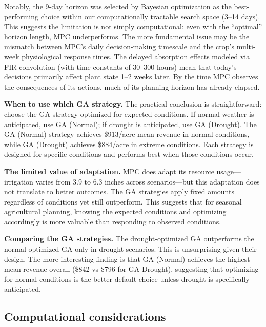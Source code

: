 \documentclass[preprint,12pt]{elsarticle}
\begin{document}
Notably, the 9-day horizon was selected by Bayesian optimization as the best-performing choice within our computationally tractable search space (3--14 days). This suggests the limitation is not simply computational: even with the ``optimal'' horizon length, MPC underperforms. The more fundamental issue may be the mismatch between MPC's daily decision-making timescale and the crop's multi-week physiological response times. The delayed absorption effects modeled via FIR convolution (with time constants of 30--300 hours) mean that today's decisions primarily affect plant state 1--2 weeks later. By the time MPC observes the consequences of its actions, much of its planning horizon has already elapsed.

\textbf{When to use which GA strategy.} The practical conclusion is straightforward: choose the GA strategy optimized for expected conditions. If normal weather is anticipated, use GA (Normal); if drought is anticipated, use GA (Drought). The GA (Normal) strategy achieves \$913/acre mean revenue in normal conditions, while GA (Drought) achieves \$884/acre in extreme conditions. Each strategy is designed for specific conditions and performs best when those conditions occur.

\textbf{The limited value of adaptation.} MPC does adapt its resource usage---irrigation varies from 3.9 to 6.3 inches across scenarios---but this adaptation does not translate to better outcomes. The GA strategies apply fixed amounts regardless of conditions yet still outperform. This suggests that for seasonal agricultural planning, knowing the expected conditions and optimizing accordingly is more valuable than responding to observed conditions.

\textbf{Comparing the GA strategies.} The drought-optimized GA outperforms the normal-optimized GA only in drought scenarios. This is unsurprising given their design. The more interesting finding is that GA (Normal) achieves the highest mean revenue overall (\$842 vs \$796 for GA Drought), suggesting that optimizing for normal conditions is the better default choice unless drought is specifically anticipated.

\subsection{Computational considerations}\label{subsec:computational}
\end{document}
